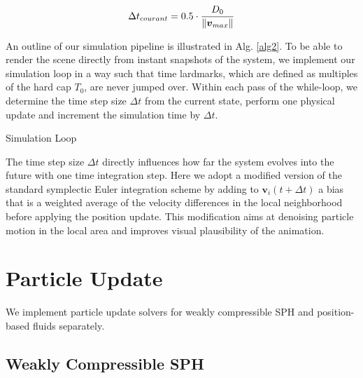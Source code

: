\documentclass[
	11pt, 
	DIV10,
	ngerman,
	a4paper, 
	oneside, 
	headings=normal, 
	captions=tableheading,
	final, 
	numbers=noenddot
]{scrartcl}
\DeclarePairedDelimiter{\norm}{\lVert}{\rVert}
\begin{document}
\begin{equation}
	\label{eq16}
	\Delta t_{courant} = 0.5 \cdot \frac{D_{0}}{\norm{\boldsymbol{v}_{max}}}
\end{equation}

An outline of our simulation pipeline is illustrated in Alg. \ref{alg2}. To be able to render the scene directly from instant snapshots of the system, we implement our simulation loop in a way such that time lardmarks, which are defined as multiples of the hard cap $ T_{0} $, are never jumped over. Within each pass of the while-loop, we determine the time step size $ \Delta t $ from the current state, perform one physical update and increment the simulation time by $ \Delta t $.

\medskip
\begin{algorithm}[H]
	\SetAlgoLined
	\caption{\label{alg2} Simulation Loop}
\end{algorithm}
\medskip

The time step size $ \Delta t $ directly influences how far the system evolves into the future with one time integration step. Here we adopt a modified version of the standard symplectic Euler integration scheme by adding to $ \mathbf{v}_{i}(t + \Delta t) $ a bias that is a weighted average of the velocity differences in the local neighborhood before applying the position update. This modification aims at denoising particle motion in the local area and improves visual plausibility of the animation.

\section{Particle Update}
\label{sec3}

We implement particle update solvers for weakly compressible SPH and position-based fluids separately.

\subsection{Weakly Compressible SPH}
\end{document}
